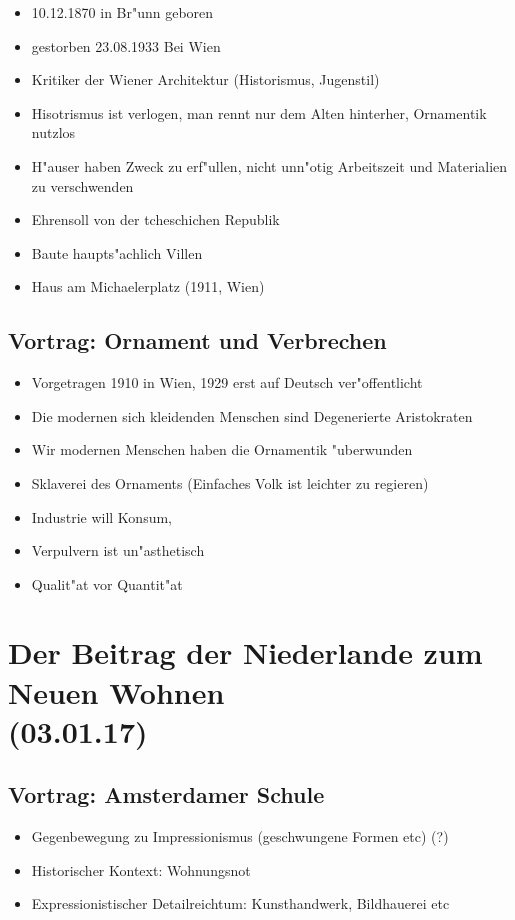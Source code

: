 \documentclass[emulatestandardclasses]{scrartcl}
\begin{document}
\begin{itemize}
  \item 10.12.1870 in Br"unn geboren
  \item gestorben 23.08.1933 Bei Wien
  \item Kritiker der Wiener Architektur (Historismus, Jugenstil)
  \item Hisotrismus ist verlogen, man rennt nur dem Alten hinterher, Ornamentik nutzlos
  \item H"auser haben Zweck zu erf"ullen, nicht unn"otig Arbeitszeit und Materialien zu verschwenden
  \item Ehrensoll von der tcheschichen Republik
  \item Baute haupts"achlich Villen
  \item Haus am Michaelerplatz (1911, Wien)
\end{itemize}


\subsection{Vortrag: Ornament und Verbrechen}

\begin{itemize}
  \item Vorgetragen 1910 in Wien, 1929 erst auf Deutsch ver"offentlicht
  \item Die modernen sich kleidenden Menschen sind Degenerierte Aristokraten
  \item Wir modernen Menschen haben die Ornamentik "uberwunden
  \item Sklaverei des Ornaments (Einfaches Volk ist leichter zu regieren)
  \item Industrie will Konsum, 
  \item Verpulvern ist un"asthetisch
  \item Qualit"at vor Quantit"at
\end{itemize}


\section{Der Beitrag der Niederlande zum Neuen Wohnen\\(03.01.17)}


\subsection{Vortrag: Amsterdamer Schule}

\begin{itemize}
  \item Gegenbewegung zu Impressionismus (geschwungene Formen etc) (?)
  \item Historischer Kontext: Wohnungsnot
  \item Expressionistischer Detailreichtum: Kunsthandwerk, Bildhauerei etc
\end{itemize}
\end{document}
